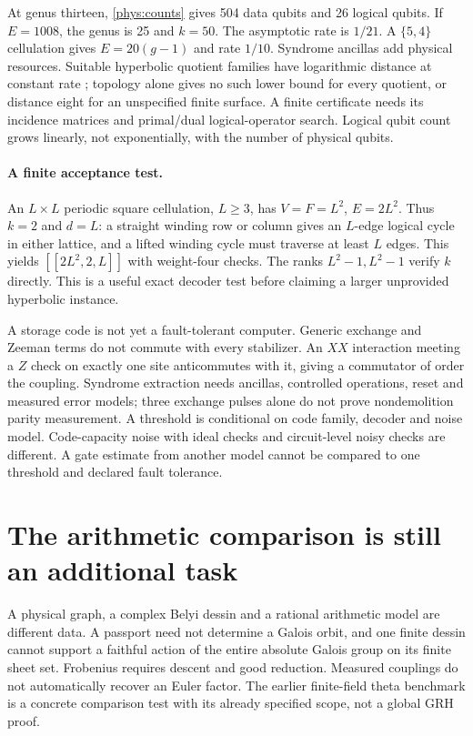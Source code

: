 \documentclass[11pt,oneside,openany]{book}
\theoremstyle{definition}\newtheorem{definition}[theorem]{Definition}
\theoremstyle{remark}\newtheorem{remark}[theorem]{Remark}
\begin{document}
At genus thirteen, \eqref{phys:counts} gives 504 data qubits and 26 logical
qubits. If $E=1008$, the genus is 25 and $k=50$. The asymptotic rate is
$1/21$. A $\{5,4\}$ cellulation gives $E=20(g-1)$ and rate $1/10$.
Syndrome ancillas add physical resources. Suitable hyperbolic quotient
families have logarithmic distance at constant rate
\cite{PhysBreuckmannTerhal,PhysDelfosse}; topology alone gives no such
lower bound for every quotient, or distance eight for an unspecified
finite surface. A finite certificate needs its incidence matrices and
primal/dual logical-operator search. Logical qubit count grows linearly,
not exponentially, with the number of physical qubits.

\paragraph{A finite acceptance test.}
An $L\times L$ periodic square cellulation, $L\ge3$, has
$V=F=L^2$, $E=2L^2$. Thus $k=2$ and $d=L$: a straight winding row
or column gives an $L$-edge logical cycle in either lattice, and a lifted
winding cycle must traverse at least $L$ edges. This yields
$[[2L^2,2,L]]$ with weight-four checks. The ranks $L^2-1,L^2-1$ verify
$k$ directly. This is a useful exact decoder test before claiming a
larger unprovided hyperbolic instance.

A storage code is not yet a fault-tolerant computer. Generic exchange
and Zeeman terms do not commute with every stabilizer. An $XX$ interaction
meeting a $Z$ check on exactly one site anticommutes with it, giving a
commutator of order the coupling. Syndrome extraction needs ancillas,
controlled operations, reset and measured error models; three exchange
pulses alone do not prove nondemolition parity measurement. A threshold
is conditional on code family, decoder and noise model. Code-capacity
noise with ideal checks and circuit-level noisy checks are different.
A gate estimate from another model cannot be compared to one threshold
and declared fault tolerance.

\section{The arithmetic comparison is still an additional task}
A physical graph, a complex Belyi dessin and a rational arithmetic model
are different data. A passport need not determine a Galois orbit, and one
finite dessin cannot support a faithful action of the entire absolute
Galois group on its finite sheet set. Frobenius requires descent and good
reduction. Measured couplings do not automatically recover an Euler factor.
The earlier finite-field theta benchmark is a concrete comparison test
with its already specified scope, not a global GRH proof.
\end{document}
